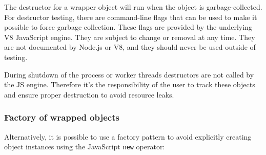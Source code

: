 \begin{Shaded}
\begin{Highlighting}[]
\OperatorTok{=} \NormalTok{(}\NormalTok{)}\OperatorTok{;}

\OperatorTok{=} \NormalTok{(}\NormalTok{)}\OperatorTok{;}
\NormalTok{())}\OperatorTok{;}
\NormalTok{())}\OperatorTok{;}
\NormalTok{())}\OperatorTok{;}
\end{Highlighting}
\end{Shaded}

The destructor for a wrapper object will run when the object is
garbage-collected. For destructor testing, there are command-line flags
that can be used to make it possible to force garbage collection. These
flags are provided by the underlying V8 JavaScript engine. They are
subject to change or removal at any time. They are not documented by
Node.js or V8, and they should never be used outside of testing.

During shutdown of the process or worker threads destructors are not
called by the JS engine. Therefore it's the responsibility of the user
to track these objects and ensure proper destruction to avoid resource
leaks.

\subsubsection{Factory of wrapped
objects}\label{factory-of-wrapped-objects}

Alternatively, it is possible to use a factory pattern to avoid
explicitly creating object instances using the JavaScript \texttt{new}
operator:

\begin{Shaded}
\begin{Highlighting}[]
\OperatorTok{=}\NormalTok{()}\OperatorTok{;}
\end{Highlighting}
\end{Shaded}

